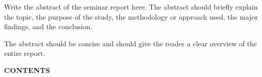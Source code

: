 \documentclass[12pt]{article}
\begin{document}
\vspace{0.6cm}

Write the abstract of the seminar report here. The abstract should briefly explain the topic, the purpose of the study, the methodology or approach used, the major findings, and the conclusion.

\par\vspace{0.3cm}

The abstract should be concise and should give the reader a clear overview of the entire report.

\newpage

\begin{center}
\textbf{\Large CONTENTS}
\end{center}

\vspace{0.8cm}
\end{document}
